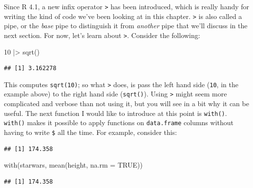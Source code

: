 \documentclass[
]{article}
\newenvironment{Shaded}{\begin{snugshade}}{\end{snugshade}}
\newcommand{\AttributeTok}[1]{\textcolor[rgb]{0.77,0.63,0.00}{#1}}
\newcommand{\ConstantTok}[1]{\textcolor[rgb]{0.00,0.00,0.00}{#1}}
\newcommand{\DecValTok}[1]{\textcolor[rgb]{0.00,0.00,0.81}{#1}}
\newcommand{\FunctionTok}[1]{\textcolor[rgb]{0.00,0.00,0.00}{#1}}
\newcommand{\NormalTok}[1]{#1}
\newcommand{\SpecialCharTok}[1]{\textcolor[rgb]{0.00,0.00,0.00}{#1}}
\begin{document}
Since R 4.1, a new infix operator \texttt{\textbar{}\textgreater{}} has been introduced, which is really handy for writing the kind of
code we've been looking at in this chapter. \texttt{\textbar{}\textgreater{}} is also called a pipe, or the \emph{base} pipe to distinguish
it from \emph{another} pipe that we'll discuss in the next section. For now, let's learn about \texttt{\textbar{}\textgreater{}}.
Consider the following:

\begin{Shaded}
\begin{Highlighting}[]
\DecValTok{10} \SpecialCharTok{|\textgreater{}} \FunctionTok{sqrt}\NormalTok{()}
\end{Highlighting}
\end{Shaded}

\begin{verbatim}
## [1] 3.162278
\end{verbatim}

This computes \texttt{sqrt(10)}; so what \texttt{\textbar{}\textgreater{}} does, is pass the left hand side (\texttt{10}, in the example above) to the
right hand side (\texttt{sqrt()}). Using \texttt{\textbar{}\textgreater{}} might seem more complicated and verbose than not using it, but you
will see in a bit why it can be useful. The next function I would like to introduce at this point is \texttt{with()}.
\texttt{with()} makes it possible to apply functions on \texttt{data.frame} columns without having to write \texttt{\$} all the time.
For example, consider this:

\begin{Shaded}
\end{Shaded}

\begin{verbatim}
## [1] 174.358
\end{verbatim}

\begin{Shaded}
\begin{Highlighting}[]
\FunctionTok{with}\NormalTok{(starwars,}
     \FunctionTok{mean}\NormalTok{(height, }\AttributeTok{na.rm =} \ConstantTok{TRUE}\NormalTok{))}
\end{Highlighting}
\end{Shaded}

\begin{verbatim}
## [1] 174.358
\end{verbatim}
\end{document}
